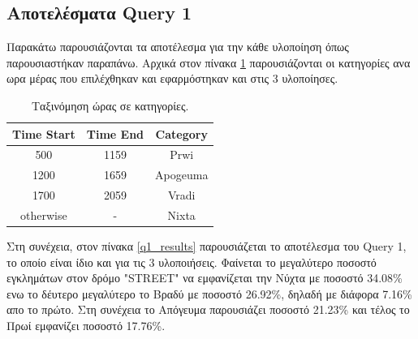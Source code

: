 \documentclass[12pt, a4paper]{article}
\begin{document}
\subsection*{Αποτελέσματα Query 1}

Παρακάτω παρουσιάζονται τα αποτέλεσμα για την κάθε υλοποίηση όπως παρουσιαστήκαν παραπάνω.
Αρχικά στον πίνακα \ref{time_category} παρουσιάζονται οι κατηγορίες ανα ωρα μέρας που επιλέχθηκαν
και εφαρμόστηκαν και στις 3 υλοποίησες.


\begin{table}[h!]
\centering
\begin{tabular}{ccc} 

Time Start & Time End & Category \\ 
\hline
500 & 1159 &  Prwi \\ 
1200 & 1659 & Apogeuma \\
1700 & 2059 &  Vradi \\
otherwise & - &  Nixta \\
\hline

\end{tabular}
\caption{Ταξινόμηση ώρας σε κατηγορίες.}
\label{time_category}
\end{table}

Στη συνέχεια, στον πίνακα \ref{q1_results} παρουσιάζεται το αποτέλεσμα του Query 1, το
οποίο είναι ίδιο και για τις 3 υλοποιήσεις. Φαίνεται το μεγαλύτερο ποσοστό εγκλημάτων στον
δρόμο "STREET" να εμφανίζεται την Νύχτα με ποσοστό 34.08\% ενω το δέυτερο μεγαλύτερο
το Βραδύ με ποσοστό 26.92\%, δηλαδή με διάφορα 7.16\% απο το πρώτο. Στη συνέχεια το
Απόγευμα παρουσιάζει ποσοστό 21.23\% και τέλος το Πρωί εμφανίζει ποσοστό 17.76\%.



\end{document}

